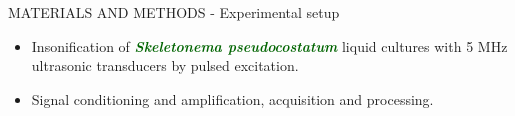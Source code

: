 \documentclass[handout]{beamer}
\newcommand\Fontable{\fontsize{9}{10}\selectfont}
\begin{document}
\begin{frame}{MATERIALS AND METHODS - Experimental setup}
\Fontable

\begin{minipage}[c]{1\linewidth}
\begin{minipage}[c]{0.7\linewidth}
\begin{itemize}
	\Fontable
	\item<3-> Insonification of \textcolor{darkgreen}{{\bf \textit{Skeletonema pseudocostatum}}} liquid cultures with 5 MHz ultrasonic transducers by pulsed excitation.
\end{itemize}
\end{minipage}
\begin{minipage}[c]{0.29\linewidth}
\end{minipage}
\end{minipage}

\begin{itemize}
\item<3-> Signal conditioning and amplification, acquisition and processing.
\end{itemize}


\end{frame}
\end{document}
